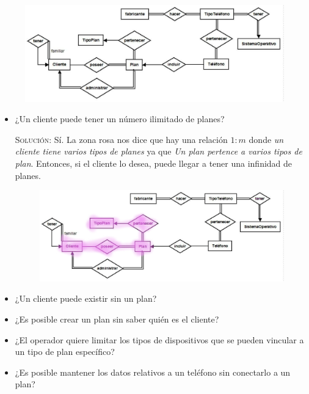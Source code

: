 \documentclass[letterpaper,11pt]{article}
\begin{document}
\begin{figure}[h]
    \centering
    \includegraphics[scale=0.4]{./imagenes/modelo.jpg}
\end{figure}

\begin{itemize}
    \item ¿Un cliente puede tener un número ilimitado de planes?

    \textsc{Solución:} Sí. La zona rosa nos dice que hay una relación $1:m$ 
    donde \textit{un cliente tiene varios tipos de planes} ya que 
    \textit{Un plan pertence a varios tipos de plan}. Entonces, si el 
    cliente lo desea, puede llegar a tener una infinidad de planes.

    \begin{figure}[h]
        \centering
        \includegraphics[scale=0.4]{./imagenes/modelo1.jpg}
    \end{figure}
    
    \item ¿Un cliente puede existir sin un plan?
    
    \item ¿Es posible crear un plan sin saber quién es el cliente?

    \item ¿El operador quiere limitar los tipos de dispositivos que se pueden 
    vincular a un tipo de plan específico?

    \item ¿Es posible mantener los datos relativos a un teléfono sin conectarlo
    a un plan?


\end{itemize}
\end{document}

